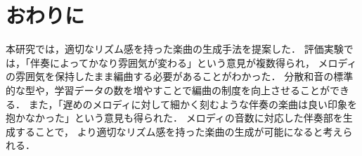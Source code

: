 \chapter{おわりに}
本研究では，適切なリズム感を持った楽曲の生成手法を提案した．
評価実験では，「伴奏によってかなり雰囲気が変わる」という意見が複数得られ，
メロディの雰囲気を保持したまま編曲する必要があることがわかった．
分散和音の標準的な型や，学習データの数を増やすことで編曲の制度を向上させることができる．
また，「遅めのメロディに対して細かく刻むような伴奏の楽曲は良い印象を抱かなかった」という意見も得られた．
メロディの音数に対応した伴奏部を生成することで，
より適切なリズム感を持った楽曲の生成が可能になると考えられる．